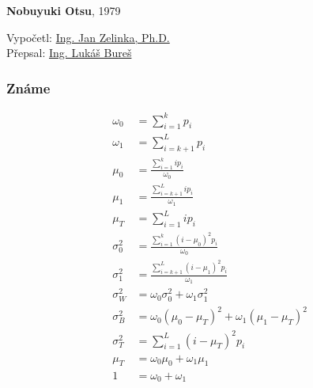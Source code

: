 \documentclass[12pt, a4paper]{report}
\begin{document}
\begin{center}
\par{\textbf{Nobuyuki Otsu}, 1979}
\end{center}
Vypočetl: \href{mailto:zelinka@kky.zcu.cz}{Ing. Jan Zelinka, Ph.D.}\\
Přepsal: \href{mailto:lbures@kky.zcu.cz}{Ing. Lukáš Bureš}
\subsubsection*{Známe}

\begin{eqnarray}
	&\omega_0 &= \sum_{i = 1}^{k} p_i\\
	&\omega_1 &= \sum_{i = k + 1}^{L} p_i\\
	&\mu_0 &= \frac{\sum_{i = 1}^{k} i  p_i}{\omega_0}\\
	&\mu_1 &= \frac{\sum_{i = k + 1}^{L} i  p_i}{\omega_1}\\
	&\mu_T &= \sum_{i = 1}^{L} i  p_i\\
	&\sigma_{0}^{2} &= \frac{\sum_{i = 1}^{k} \left( i - \mu_0 \right)^2  p_i}{\omega_0}\\
	&\sigma_{1}^{2} &= \frac{\sum_{i = k + 1}^{L} \left( i - \mu_1 \right)^2  p_i}{\omega_1}\\
	&\sigma_{W}^{2} &= \omega_0 \sigma_{0}^{2} + \omega_1 \sigma_{1}^{2}\\
	&\sigma_{B}^{2}	&= \omega_0 \left( \mu_0 - \mu_T \right)^2 + \omega_1\left( \mu_1 - \mu_T \right)^2\\
	&\sigma_{T}^{2}	&= \sum_{i = 1}^{L} \left( i - \mu_T \right)^2  p_i\\
	&\mu_T &= \omega_0 \mu_0 + \omega_1 \mu_1\\
	&1 &= \omega_0 + \omega_1
\end{eqnarray}












\newpage
\end{document}
